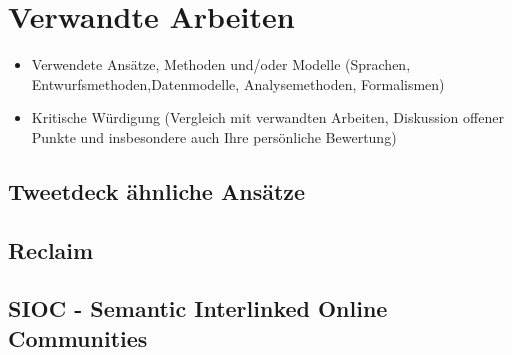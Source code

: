
\chapter{Verwandte Arbeiten}
\label{ch:relatedwork}

\begin{itemize}
	\item Verwendete Ansätze, Methoden und/oder Modelle (Sprachen, Entwurfsmethoden,Datenmodelle, Analysemethoden, Formalismen)
	\item Kritische Würdigung (Vergleich mit verwandten Arbeiten, Diskussion offener Punkte und insbesondere auch Ihre persönliche Bewertung)
\end{itemize}

\section{Tweetdeck ähnliche Ansätze} %
\label{sec:tweetdeck_hnliche_ans_tze}


\section{Reclaim} %
\label{sec:reclaim}


\section{SIOC - Semantic Interlinked Online Communities} %
\label{sec:sioc}
